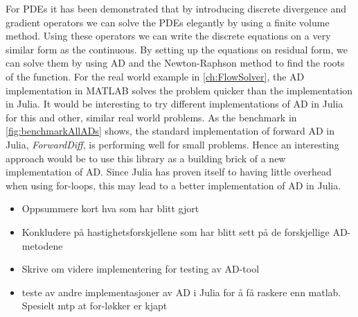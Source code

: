 For PDEs it has been demonstrated that by introducing discrete divergence and gradient operators we can solve the PDEs elegantly by using a finite volume method. Using these operators we can write the discrete equations on a very similar form as the continuous. By setting up the equations on residual form, we can solve them by using AD and the Newton-Raphson method to find the roots of the function. For the real world example in \autoref{ch:FlowSolver}, the AD implementation in MATLAB solves the problem quicker than the implementation in Julia. It would be interesting to try different implementations of AD in Julia for this and other, similar real world problems. As the benchmark in \autoref{fig:benchmarkAllADs} shows, the standard implementation of forward AD in Julia, \textit{ForwardDiff}, is performing well for small problems. Hence an interesting approach would be to use this library as a building brick of a new implementation of AD. Since Julia has proven itself to having little overhead when using for-loops, this may lead to a better implementation of AD in Julia.

\begin{itemize}
    \item Oppsummere kort hva som har blitt gjort
    \item Konkludere på hastighetsforskjellene som har blitt sett på de forskjellige AD-metodene
    \item Skrive om videre implementering for testing av AD-tool
    \item teste av andre implementasjoner av AD i Julia for å få raskere enn matlab. Spesielt mtp at for-løkker er kjapt
\end{itemize}